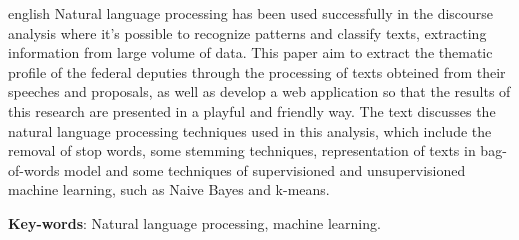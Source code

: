 \begin{resumo}[Abstract]
 \begin{otherlanguage*}{english}
   Natural language processing has been used successfully in the discourse analysis where it's possible to recognize patterns and classify texts, extracting information from large volume of data. This paper aim to extract the thematic profile of the federal deputies through the processing of texts obteined from their speeches and proposals, as well as develop a web application so that the results of this research are presented in a playful and friendly way. The text discusses the natural language processing techniques used in this analysis, which include the removal of stop words, some stemming techniques, representation of texts in bag-of-words model and some techniques of supervisioned and unsupervisioned machine learning, such as Naive Bayes and k-means.

   \vspace{\onelineskip}

   \noindent
   \textbf{Key-words}: Natural language processing, machine learning.
 \end{otherlanguage*}
\end{resumo}
